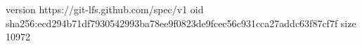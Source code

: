version https://git-lfs.github.com/spec/v1
oid sha256:ecd294b71df7930542993ba78ee9f0823de9fcec56c931cca27addc63f87cf7f
size 10972
